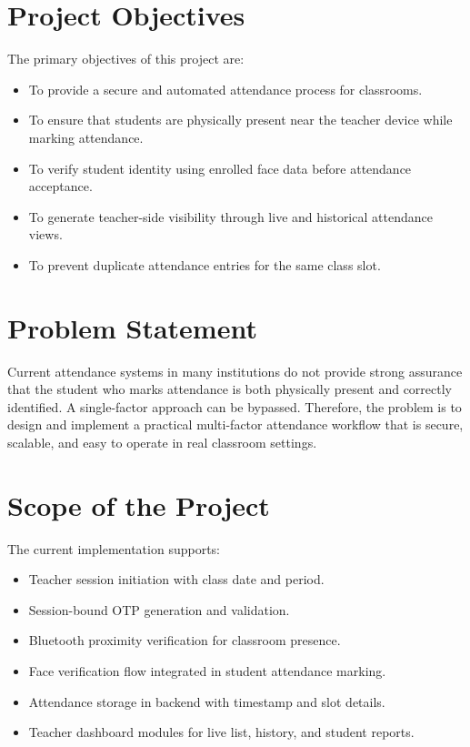 \section{Project Objectives}
The primary objectives of this project are:
\begin{itemize}
\item To provide a secure and automated attendance process for classrooms.
\item To ensure that students are physically present near the teacher device while marking attendance.
\item To verify student identity using enrolled face data before attendance acceptance.
\item To generate teacher-side visibility through live and historical attendance views.
\item To prevent duplicate attendance entries for the same class slot.
\end{itemize}

\section{Problem Statement}
Current attendance systems in many institutions do not provide strong assurance that the student who marks attendance is both physically present and correctly identified. A single-factor approach can be bypassed. Therefore, the problem is to design and implement a practical multi-factor attendance workflow that is secure, scalable, and easy to operate in real classroom settings.

\section{Scope of the Project}
The current implementation supports:
\begin{itemize}
\item Teacher session initiation with class date and period.
\item Session-bound OTP generation and validation.
\item Bluetooth proximity verification for classroom presence.
\item Face verification flow integrated in student attendance marking.
\item Attendance storage in backend with timestamp and slot details.
\item Teacher dashboard modules for live list, history, and student reports.
\end{itemize}

